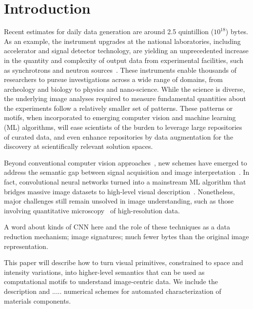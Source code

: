 \section{Introduction}
Recent estimates for daily data generation are around 2.5 quintillion ($10^{18}$) bytes. As an example, the instrument upgrades at the national laboratories, including accelerator and signal detector technology, are yielding an unprecedented increase in the quantity and complexity of output data from experimental facilities, such as synchrotrons and neutron sources~\cite{EOD:2015}. These instruments enable thousands of researchers to pursue investigations across a wide range of domains, from archeology and biology to physics and nano-science. While the science is diverse, the underlying image analyses required to measure fundamental quantities about the experiments follow a relatively smaller set of patterns. These patterns or motifs, when incorporated to emerging computer vision and machine learning (ML) algorithms, will ease scientists of the burden to leverage large repositories of curated data, and even enhance repositories by data augmentation for the discovery at scientifically relevant solution spaces.

Beyond conventional computer vision approaches~\cite{Ballard, Gonzalez, AFM:2015}, new schemes have emerged to address the semantic gap between signal acquisition and image interpretation~\cite{Zhang:2016:a}. In fact, convolutional neural networks turned into a mainstream ML algorithm that bridges massive image datasets to high-level visual description~\cite{Fei:2015}. Nonetheless, major challenges still remain unsolved in image understanding, such as those involving quantitative microscopy~\cite{Ushizima2016} of high-resolution data.

A word about kinds of CNN here and the role of these techniques as a data reduction mechanism; image signatures; much fewer bytes than the original image representation.

This paper will describe how to turn visual primitives, constrained to space and intensity variations, into higher-level semantics that can be used as computational motifs to understand image-centric data. We include the description and ..... 
numerical schemes for automated characterization of materials components.

